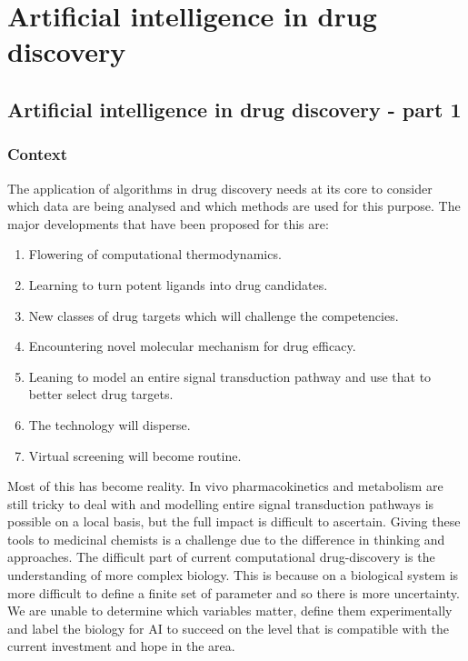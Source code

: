 \chapter{Artificial intelligence in drug discovery}

\section{Artificial intelligence in drug discovery - part 1}

	\subsection{Context}
	The application of algorithms in drug discovery needs at its core to consider which data are being analysed and which methods are used for this purpose.
	The major developments that have been proposed for this are:

	\begin{multicols}{2}
		\begin{enumerate}
			\item Flowering of computational thermodynamics.
			\item Learning to turn potent ligands into drug candidates.
			\item New classes of drug targets which will challenge the competencies.
			\item Encountering novel molecular mechanism for drug efficacy.
			\item Leaning to model an entire signal transduction pathway and use that to better select drug targets.
			\item The technology will disperse.
			\item Virtual screening will become routine.
		\end{enumerate}
	\end{multicols}

	Most of this has become reality.
	In vivo pharmacokinetics and metabolism are still tricky to deal with and modelling entire signal transduction pathways is possible on a local basis, but the full impact is difficult to ascertain.
	Giving these tools to medicinal chemists is a challenge due to the difference in thinking and approaches.
	The difficult part of current computational drug-discovery is the understanding of more complex biology.
	This is because on a biological system is more difficult to define a finite set of parameter and so there is more uncertainty.
	We are unable to determine which variables matter, define them experimentally and label the biology for AI to succeed on the level that is compatible with the current investment and hope in the area.

